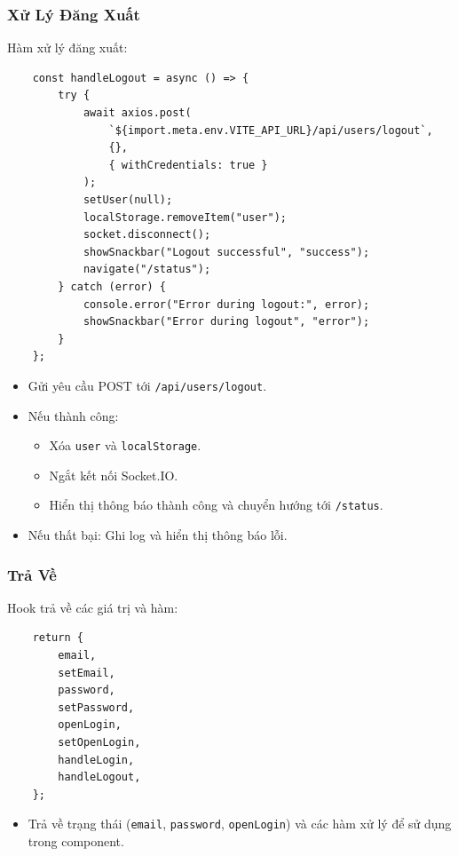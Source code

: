             \subsubsection{Xử Lý Đăng Xuất}
                \hspace*{0.6cm}Hàm xử lý đăng xuất:
                \begin{lstlisting}
    const handleLogout = async () => {
        try {
            await axios.post(
                `${import.meta.env.VITE_API_URL}/api/users/logout`,
                {},
                { withCredentials: true }
            );
            setUser(null);
            localStorage.removeItem("user");
            socket.disconnect();
            showSnackbar("Logout successful", "success");
            navigate("/status");
        } catch (error) {
            console.error("Error during logout:", error);
            showSnackbar("Error during logout", "error");
        }
    };
                \end{lstlisting}
                \begin{itemize}
                    \item Gửi yêu cầu POST tới \texttt{/api/users/logout}.
                    \item Nếu thành công:
                    \begin{itemize}
                        \item Xóa \texttt{user} và \texttt{localStorage}.
                        \item Ngắt kết nối Socket.IO.
                        \item Hiển thị thông báo thành công và chuyển hướng tới \texttt{/status}.
                    \end{itemize}
                    \item Nếu thất bại: Ghi log và hiển thị thông báo lỗi.
                \end{itemize}

            \subsubsection{Trả Về}
                \hspace*{0.6cm}Hook trả về các giá trị và hàm:
                \begin{lstlisting}
    return {
        email,
        setEmail,
        password,
        setPassword,
        openLogin,
        setOpenLogin,
        handleLogin,
        handleLogout,
    };
                \end{lstlisting}
                \begin{itemize}
                    \item Trả về trạng thái (\texttt{email}, \texttt{password}, \texttt{openLogin}) và các hàm xử lý để sử dụng trong component.
                \end{itemize}

